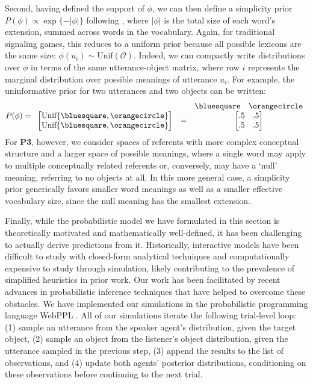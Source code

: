 Second, having defined the support of $\phi$, we can then define a simplicity prior $P(\phi) \propto \exp\{-|\phi|\}$ following , where $|\phi|$ is the total size of each word's extension, summed across words in the vocabulary. 
Again, for traditional signaling games, this reduces to a uniform prior because all possible lexicons are the same size: $\phi(u_i) \sim \textrm{Unif}(\mathcal{O})$.
Indeed, we can compactly write distributions over $\phi$ in terms of the same utterance-object matrix, where row $i$ represents the marginal distribution over possible meanings of utterance $u_i$.
For example, the uninformative prior for two utterances and two objects can be written:
$$P(\phi) =  \begin{array}{ccc}
& & \bluesquare \,\,\,\,\,\,\orangecircle \\
\begin{bmatrix}
\textrm{Unif}\{\bluesquare,\orangecircle\} \\
\textrm{Unif}\{\bluesquare,\orangecircle\} \\
\end{bmatrix} & = & \begin{bmatrix}
.5 & .5  \\
.5 & .5 \\
\end{bmatrix}
\end{array}$$
For \textbf{P3}, however, we consider spaces of referents with more complex conceptual structure and a larger space of possible meanings, where a single word may apply to multiple conceptually related referents or, conversely, may have a `null' meaning, referring to no objects at all.
In this more general case, a simplicity prior generically favors smaller word meanings as well as a smaller effective vocabulary size, since the null meaning has the smallest extension. 

Finally, while the probabilistic model we have formulated in this section is theoretically motivated and mathematically well-defined, it has been challenging to actually derive predictions from it.
Historically, interactive models have been difficult to study with closed-form analytical techniques and computationally expensive to study through simulation, likely contributing to the prevalence of simplified heuristics in prior work. 
Our work has been facilitated by recent advances in probabilistic inference techniques that have helped to overcome these obstacles. 
We have implemented our simulations in the probabilistic programming language WebPPL \cite{GoodmanStuhlmuller14_DIPPL}.
All of our simulations iterate the following trial-level loop: (1) sample an utterance from the speaker agent's distribution, given the target object, (2) sample an object from the listener's object distribution, given the utterance sampled in the previous step, (3) append the results to the list of observations, and (4) update both agents' posterior distributions, conditioning on these observations before continuing to the next trial.

